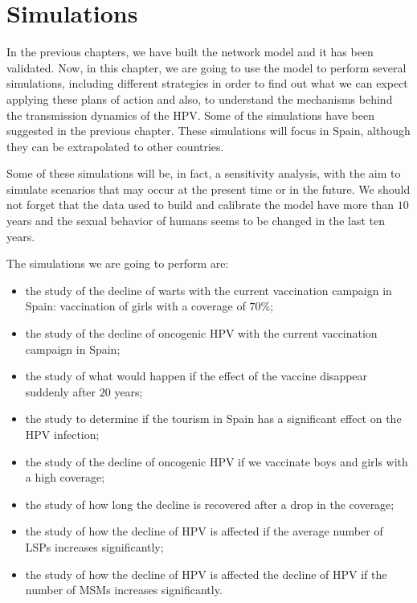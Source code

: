 \chapter{Simulations}\label{HPVSpain}
In the previous chapters, we have built the network model and it has been validated. Now, in this chapter, we are going to use the model to perform several simulations, including different strategies in order to find out what we can expect applying these plans of action and also, to understand the mechanisms behind the transmission dynamics of the HPV. Some of the simulations have been suggested in the previous chapter. These simulations will focus in Spain, although they can be extrapolated to other countries. 

Some of these simulations will be, in fact, a sensitivity analysis, with the aim to simulate scenarios that may occur at the present time or in the future. We should not forget that the data used to build and calibrate the model have more than $10$ years and the sexual behavior of humans seems to be changed in the last ten years.

The simulations we are going to perform are:

\begin{itemize}
\item the study of the decline of warts with the current vaccination campaign in Spain: vaccination of girls with a coverage of $70\%$;
\item the study of the decline of oncogenic HPV with the current vaccination campaign in Spain;
\item the study of what would happen if the effect of the vaccine disappear suddenly after $20$ years;
\item the study to determine if the tourism in Spain has a significant effect on the HPV infection;
\item the study of the decline of oncogenic HPV if we vaccinate boys and girls with a high coverage;
\item the study of how long the decline is recovered after a drop in the coverage;
\item the study of how the decline of HPV is affected  if the average number of LSPs increases significantly;
\item the study of how the decline of HPV is affected the decline of HPV if the number of MSMs increases significantly.
\end{itemize}

